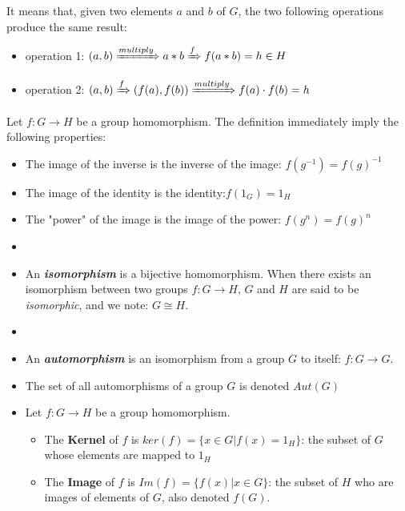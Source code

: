 It means that, given two elements $a$ and $b$ of $G$, the two following operations produce the same result: 
\begin{itemize}
\item operation 1: $(a, b) \xRightarrow{multiply} a*b \xRightarrow{f} f(a*b) = h \in H$
\item operation 2: $(a, b) \xRightarrow{f} (f(a), f(b)) \xRightarrow{multiply} f(a)\cdot f(b) = h$
\end{itemize}

\begin{remark}
    Let $f: G \longrightarrow H$ be a group homomorphism. The definition immediately imply the following properties:
    \begin{itemize}
        \item The image of the inverse is the inverse of the image: $f(g^{-1}) = f(g)^{-1}$
        \item The image of the identity is the identity:$f(1_G) = 1_H$
        \item The "power" of the image is the image of the power: $f(g^n) = f(g)^n$
    \end{itemize}
\end{remark}

\begin{boxedDefinition}
    \begin{itemize}
    \item[]
    
    \item An \textit{\textbf{isomorphism}} is a bijective homomorphism. When there exists an isomorphism between two groups $f:G \longrightarrow H$, $G$ and $H$ are said to be \textit{isomorphic}, and we note: $G\cong H$.
    \item 
    \item
    An \textit{\textbf{automorphism}} is an isomorphism from a group $G$ to itself: $f: G \longrightarrow G$.
    \item[] The set of all automorphisms of a group $G$ is denoted $Aut(G)$
    \item Let $f: G \longrightarrow H$ be a group homomorphism. 
    \begin{itemize}
    \item The \textbf{Kernel} of $f$ is $ker(f) = \{x \in G | f(x) = 1_H\}$: the subset of $G$ whose elements are mapped to $1_H$
    \item The \textbf{Image} of $f$ is $Im(f) = \{f(x) | x \in G\}$: the subset of $H$ who are images of elements of $G$, also denoted $f(G)$.
    \end{itemize}
    \end{itemize}
\end{boxedDefinition}

